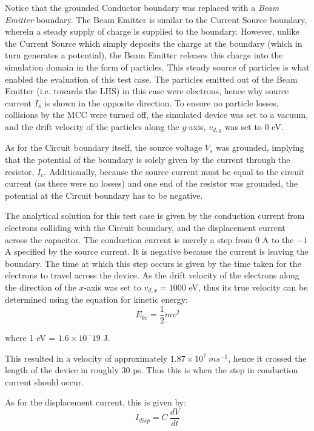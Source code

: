 Notice that the grounded Conductor boundary was replaced with a \textit{Beam Emitter} boundary. The Beam Emitter is similar to the Current Source boundary, wherein a steady supply of charge is supplied to the boundary. However, unlike the Current Source which simply deposits the charge at the boundary (which in turn generates a potential), the Beam Emitter releases this charge into the simulation domain in the form of particles. This steady source of particles is what enabled the evaluation of this test case. The particles emitted out of the Beam Emitter (i.e. towards the LHS) in this case were electrons, hence why source current $I_s$ is shown in the opposite direction. To ensure no particle losses, collisions by the MCC were turned off, the simulated device was set to a vacuum, and the drift velocity of the particles along the $y$-axis, $v_{d, y}$ was set to 0 eV. 

As for the Circuit boundary itself, the source voltage $V_s$ was grounded, implying that the potential of the boundary is solely given by the current through the resistor, $I_c$. Additionally, because the source current must be equal to the circuit current (as there were no losses) and one end of the resistor was grounded, the potential at the Circuit boundary has to be negative.

The analytical solution for this test case is given by the conduction current from electrons colliding with the Circuit boundary, and the displacement current across the capacitor. The conduction current is merely a step from 0 A to the $-1$ A specified by the source current. It is negative because the current is leaving the boundary. The time at which this step occurs is given by the time taken for the electrons to travel across the device. As the drift velocity of the electrons along the direction of the $x$-axis was set to $v_{d, x} = 1000$ eV, thus its true velocity can be determined using the equation for kinetic energy:
\begin{equation}
	E_{ke} = \frac{1}{2}mv^2
\end{equation}

where 1 eV = $1.6 \times 10^-{19}$ J. 

This resulted in a velocity of approximately $1.87 \times 10^7 \ ms^{-1}$, hence it crossed the length of the device in roughly 30 ps. Thus this is when the step in conduction current should occur.

As for the displacement current, this is given by:
\begin{equation}
	I_{disp} = C\ \frac{dV}{dt}
\end{equation}

